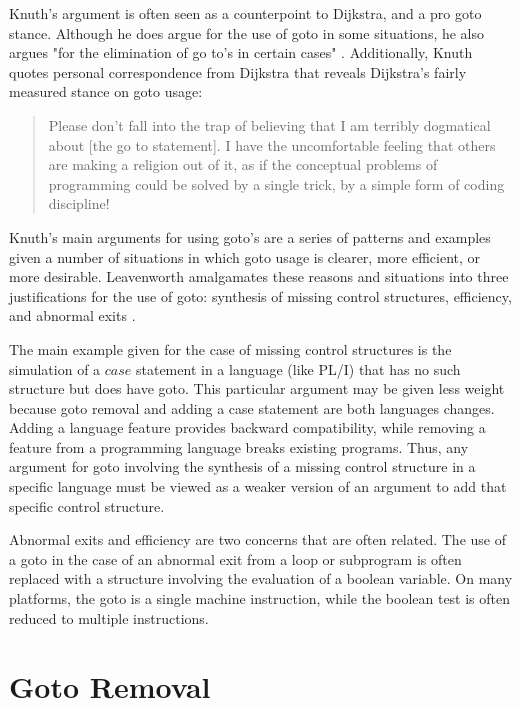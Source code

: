 \documentclass[letterpaper,10pt,twocolumn]{article}
\begin{document}
Knuth's argument is often seen as a counterpoint to Dijkstra, and a pro goto
stance.  Although he does argue for the use of goto in some situations, he
also argues "for the elimination of go to's in certain cases" \cite{knuth}.
Additionally, Knuth quotes personal correspondence from Dijkstra \cite{knuth} that
reveals Dijkstra's fairly measured stance on goto usage:

\begin{quote}
Please don't fall into the trap of believing that I am terribly dogmatical about
[the go to statement].  I have the uncomfortable feeling that
others are making a religion out of it, as if the conceptual problems of
programming could be solved by a single trick, by a simple form of coding
discipline!  \cite{dijkstra-personal}
\end{quote}

Knuth's main arguments for using goto's are a series of patterns and examples
given a number of situations in which goto usage is clearer, more efficient, or
more desirable.  Leavenworth amalgamates these reasons and situations into three
justifications for the use of goto: synthesis of missing control structures,
efficiency, and abnormal exits \cite{leavenworth}.

The main example given for the case of missing control structures is the
simulation of a $case$ statement in a language (like PL/I) that has no such
structure but does have goto.  This particular argument may be given less weight
because goto removal and adding a case statement are both languages changes.
Adding a language feature provides backward compatibility, while removing a
feature from a programming language breaks existing programs.
Thus, any argument for goto involving the synthesis of a missing
control structure in a specific language must be viewed as a weaker version of
an argument to add that specific control structure.

Abnormal exits and efficiency are two concerns that are often related.  The
use of a goto in the case of an abnormal exit from a loop or subprogram is
often replaced with a structure involving the evaluation of a boolean variable.
On many platforms, the goto is a single machine instruction, while the boolean
test is often reduced to multiple instructions.


\section{Goto Removal}
\end{document}
